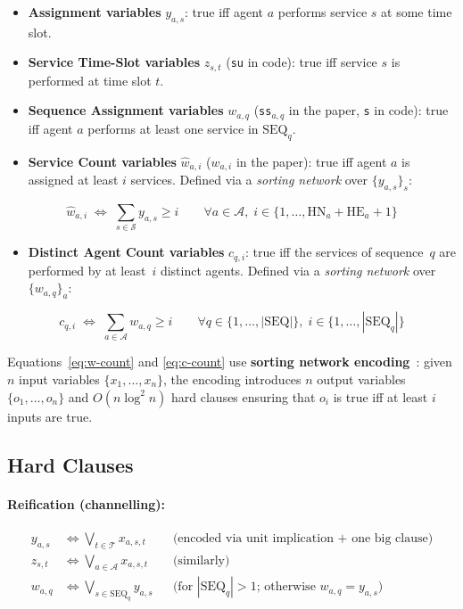 \documentclass[11pt,a4paper]{article}
\newcommand{\setA}{\mathcal{A}}
\newcommand{\setS}{\mathcal{S}}
\newcommand{\setT}{\mathcal{T}}
\newcommand{\SEQ}{\mathrm{SEQ}}
\newcommand{\HN}{\mathrm{HN}}
\newcommand{\HE}{\mathrm{HE}}
\begin{document}
\begin{itemize}
    \item \textbf{Assignment variables} $y_{a,s}$: true iff agent $a$ performs
          service $s$ at some time slot.
    \item \textbf{Service Time-Slot variables} $z_{s,t}$
          (\texttt{su} in code): true iff service $s$ is performed at time
          slot $t$.
    \item \textbf{Sequence Assignment variables} $w_{a,q}$
          (\texttt{ss}$_{a,q}$ in the paper, \texttt{s} in code): true iff
          agent $a$ performs at least one service in $\SEQ_q$.
    \item \textbf{Service Count variables} $\hat{w}_{a,i}$
          ($w_{a,i}$ in the paper): true iff agent $a$ is assigned at least $i$
          services.  Defined via a \emph{sorting network} over $\{y_{a,s}\}_s$:
\end{itemize}
\begin{equation}\label{eq:w-count}
    \hat{w}_{a,i} \;\Leftrightarrow\;
    \sum_{s \in \setS} y_{a,s} \ge i
    \qquad \forall a \in \setA,\;
    i \in \{1,\ldots, \HN_a + \HE_a + 1\}
\end{equation}
\begin{itemize}
    \item \textbf{Distinct Agent Count variables} $c_{q,i}$: true iff the
          services of sequence~$q$ are performed by at least~$i$ distinct agents.
          Defined via a \emph{sorting network} over $\{w_{a,q}\}_a$:
\end{itemize}
\begin{equation}\label{eq:c-count}
    c_{q,i} \;\Leftrightarrow\;
    \sum_{a \in \setA} w_{a,q} \ge i
    \qquad \forall q \in \{1,\ldots,|\SEQ|\},\;
    i \in \{1,\ldots,|\SEQ_q|\}
\end{equation}

\noindent
Equations~\eqref{eq:w-count} and \eqref{eq:c-count} use
\textbf{sorting network encoding}~\cite{asin2011cardinality}: given $n$ input
variables $\{x_1,\ldots,x_n\}$, the encoding introduces $n$ output variables
$\{o_1,\ldots,o_n\}$ and $O(n\log^2 n)$ hard clauses ensuring that $o_i$ is
true iff at least $i$ inputs are true.

\subsection{Hard Clauses}

\paragraph{Reification (channelling):}
\begin{align}
    y_{a,s} &\Leftrightarrow \bigvee_{t \in \setT} x_{a,s,t}
    && \text{(encoded via unit implication + one big clause)} \label{eq:reif-y}\\
    z_{s,t} &\Leftrightarrow \bigvee_{a \in \setA} x_{a,s,t}
    && \text{(similarly)} \label{eq:reif-z}\\
    w_{a,q} &\Leftrightarrow \bigvee_{s \in \SEQ_q} y_{a,s}
    && \text{(for $|\SEQ_q| > 1$; otherwise $w_{a,q} = y_{a,s}$)}
    \label{eq:reif-w}
\end{align}
\end{document}
